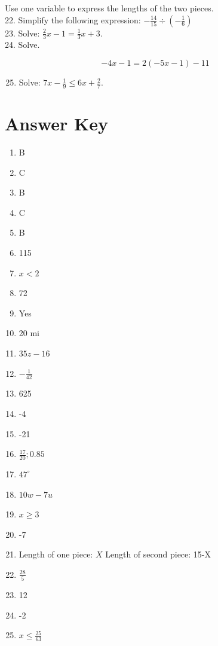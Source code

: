 \documentclass{ximera}
\begin{document}
Use one variable to express the lengths of the two pieces.\\
22. Simplify the following expression: $-\frac{14}{15} \div\left(-\frac{1}{6}\right)$\\
23. Solve: $\frac{2}{3} x-1=\frac{1}{3} x+3$.\\
24. Solve.

$$-4 x-1=2(-5 x-1)-11$$

\begin{enumerate}
  \setcounter{enumi}{24}
  \item Solve: $7 x-\frac{1}{9} \leq 6 x+\frac{2}{7}$.
\end{enumerate}

\section*{Answer Key}
\begin{enumerate}
  \item B
  \item C
  \item B
  \item C
  \item B
  \item 115
  \item $x<2$
  \item 72
  \item Yes
  \item 20 mi
  \item $35 z-16$
  \item $-\frac{1}{42}$
  \item 625
  \item -4
  \item -21
  \item $\frac{17}{20} ; 0.85$
  \item $47^{\circ}$
  \item $10 w-7 u$
  \item $x \geq 3$
  \item -7
  \item Length of one piece: $X$ Length of second piece: 15-X
  \item $\frac{28}{5}$
  \item 12
  \item -2
  \item $x \leq \frac{25}{63}$
\end{enumerate}
\end{document}
